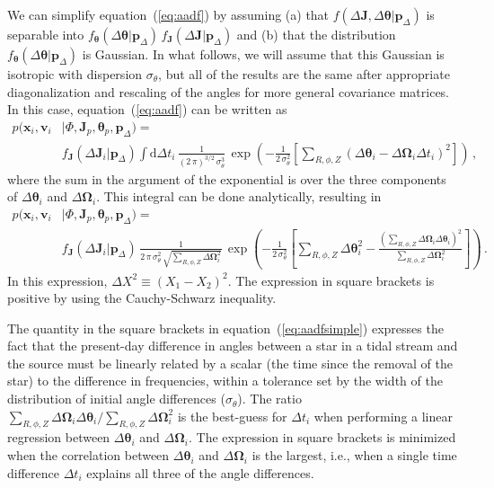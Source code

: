 \documentclass[12pt,preprint]{aastex}
\newcommand{\ie}{i.e.}
\newcommand{\dd}{\mathrm{d}}
\newcommand{\eqnname}{equation}
\renewcommand{\vec}[1]{\ensuremath{\mathbf{#1}}}
\newcommand{\vecx}{\ensuremath{\vec{x}}}
\newcommand{\vecv}{\ensuremath{\vec{v}}}
\newcommand{\vecj}{\ensuremath{\vec{J}}}
\newcommand{\veco}{\ensuremath{\vec{\Omega}}}
\newcommand{\veca}{\ensuremath{\boldsymbol\theta}}
\newcommand{\paramsdiff}{\ensuremath{\vec{p}_\Delta}}
\begin{document}
We can simplify \eqnname~(\ref{eq:aadf}) by assuming (a) that
$f(\Delta \vecj,\Delta \veca|\paramsdiff)$ is separable into
$f_{\veca}(\Delta \veca|\paramsdiff)\,f_{\vecj}(\Delta
\vecj|\paramsdiff)$ and (b) that the distribution $f_{\veca}(\Delta
\veca|\paramsdiff)$ is Gaussian. In what follows, we will assume that
this Gaussian is isotropic with dispersion $\sigma_\theta$, but all of
the results are the same after appropriate diagonalization and
rescaling of the angles for more general covariance matrices. In this
case, \eqnname~(\ref{eq:aadf}) can be written as
\begin{equation}
\begin{split}
  p(\vecx_i,\vecv_i & | \Phi,\vecj_p,\veca_p,\paramsdiff) 
   = \\
   & f_{\vecj}(\Delta \vecj_i|\paramsdiff) \int \dd \Delta t_i\,
  \frac{1}{(2\,\pi)^{3/2}\,\sigma_\theta^3}\,\exp\left(-\frac{1}{2\,\sigma_\theta^2}\left[\sum_{R,\phi,Z}\left(\Delta \veca_i-\Delta \veco_i\Delta t_i\right)^2\right]\right)\,,
\end{split}
\end{equation}
where the sum in the argument of the exponential is over the three
components of $\Delta \veca_i$ and $\Delta \veco_i$. This integral can
be done analytically, resulting in
\begin{equation}\label{eq:aadfsimple}
\begin{split}
  p(\vecx_i,\vecv_i & | \Phi,\vecj_p,\veca_p,\paramsdiff) 
   = \\
   & f_{\vecj}(\Delta \vecj_i|\paramsdiff) \,  \frac{1}{2\,\pi\,\sigma_\theta^2\,\sqrt{\sum_{R,\phi,Z}\Delta \veco_i^2}}\,\exp\left(-\frac{1}{2\,\sigma_\theta^2}\left[\sum_{R,\phi,Z}\Delta \veca^2_i-\frac{\left(\sum_{R,\phi,Z} \Delta \veco_i\Delta \veca_i\right)^2}{\sum_{R,\phi,Z}\Delta \veco_i^2}\right]\right)\,.
\end{split}
\end{equation}
In this expression, $\Delta X^2 \equiv (X_1-X_2)^2$. The expression in
square brackets is positive by using the Cauchy-Schwarz inequality.

The quantity in the square brackets in \eqnname~(\ref{eq:aadfsimple})
expresses the fact that the present-day difference in angles between a
star in a tidal stream and the source must be linearly related by a
scalar (the time since the removal of the star) to the difference in
frequencies, within a tolerance set by the width of the distribution
of initial angle differences ($\sigma_\theta$). The ratio
$\sum_{R,\phi,Z} \Delta \veco_i\Delta \veca_i/\sum_{R,\phi,Z}\Delta
\veco_i^2$ is the best-guess for $\Delta t_i$ when performing a linear
regression between $\Delta \veca_i$ and $\Delta \veco_i$. The
expression in square brackets is minimized when the correlation
between $\Delta \veca_i$ and $\Delta \veco_i$ is the largest, \ie,
when a single time difference $\Delta t_i$ explains all three of the
angle differences.
\end{document}
